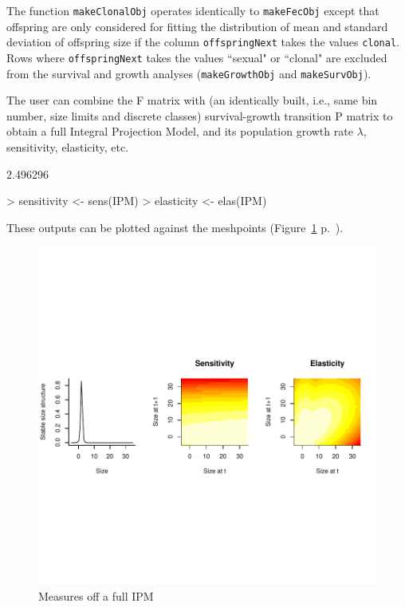 \documentclass{article}
\begin{document}
The function {\tt makeClonalObj} operates identically to {\tt makeFecObj} except that offspring are only considered for fitting the distribution of mean and standard deviation of offspring size if the column {\tt offspringNext} takes the values {\tt clonal}. Rows where {\tt offspringNext} takes the values ``sexual" or ``clonal" are excluded from the survival and growth analyses ({\tt makeGrowthObj} and {\tt makeSurvObj}).

The user can combine the F matrix with (an identically built, i.e., same bin number, size limits and discrete classes) survival-growth transition P matrix to obtain a full Integral Projection Model, and its population growth rate $\lambda$, sensitivity, elasticity, etc. 
\begin{Schunk}
\begin{Soutput}
[1] 2.496296
\end{Soutput}
\begin{Sinput}
> sensitivity <- sens(IPM)
> elasticity <- elas(IPM)
\end{Sinput}
\end{Schunk}
These outputs can be plotted against the meshpoints (Figure~\ref{fig:four} p.~\pageref{fig:four}).
\begin{figure}
\begin{center}
\includegraphics{IPMpack_vignette-fig4}
\end{center}
\caption{Measures off a full IPM}
\label{fig:four}
\end{figure}
\end{document}
